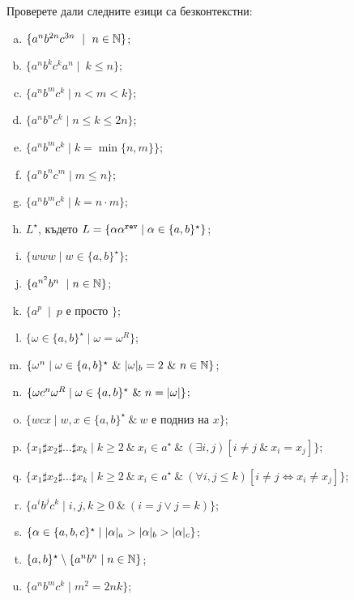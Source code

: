 \begin{extra}
\begin{problem}
  Проверете дали следните езици са безконтекстни:
  \begin{enumerate}[a)]
  \item
    $\{a^nb^{2n}c^{3n}\ \mid\ n\in\Nat\}$;
  \item
    $\{a^nb^kc^ka^n\mid\ k \leq n\}$;
  \item
    $\{a^nb^mc^k\mid n < m < k\}$;
  \item
    $\{a^nb^nc^k\mid n \leq k \leq 2n\}$;
  \item
    $\{a^nb^mc^k\mid k = \min\{n,m\}\}$;
  \item
    $\{a^nb^nc^m\mid m \leq n\}$;
  \item
    $\{a^nb^mc^k\mid k = n\cdot m\}$;
  \item
    $L^\star$, където
    $L = \{\alpha\alpha^{\texttt{rev}} \mid \alpha \in \{a,b\}^\star\}$;
  \item
    $\{www\mid w\in \{a,b\}^\star\}$;
  \item
    $\{a^{n^2}b^n\ \mid n \in \mathbb{N}\}$;
  \item
    $\{a^p\ \mid\ p\mbox{ е просто }\}$;
  \item
    $\{\omega \in \{a,b\}^\star \mid \omega = \omega^R\}$;
  \item
    $\{\omega^n \mid \omega \in \{a,b\}^\star\ \&\ \vert{\omega}\vert_{b} = 2\ \&\ n \in \mathbb{N}\}$;
  \item
    $\{\omega c^n \omega^R \mid \omega \in \{a,b\}^\star\ \&\ n = \vert{\omega}\vert\}$;
  \item
    $\{w c x\mid w,x\in \{a,b\}^\star\ \&\ w\mbox{ е подниз на }x\}$;
  \item
    $\{x_1 \sharp x_2 \sharp \dots \sharp x_k\mid k\geq 2\ \&\ x_i\in a^\star\ \&\ (\exists i,j)[i \neq j\ \&\ x_i = x_j]\}$;
  \item
    $\{x_1 \sharp x_2 \sharp \dots \sharp x_k\mid k\geq 2\ \&\ x_i\in a^\star\ \&\ (\forall i,j \leq k)[i \neq j \iff x_i \neq x_j]\}$;
  \item
    $\{a^ib^jc^k\mid i,j,k\geq 0\ \&\ (i = j \vee j = k)\}$;
  \item
    $\{\alpha \in \{a,b,c\}^\star\mid \vert{\alpha}\vert_{a} > \vert{\alpha}\vert_{b} > \vert{\alpha}\vert_{c}\}$;
  \item
    $\{a,b\}^\star \setminus \{a^nb^n\mid n\in \mathbb{N}\}$;
  \item
    $\{a^nb^mc^k \mid m^2 = 2nk\}$;


\end{enumerate}
\end{problem}
\end{extra}
